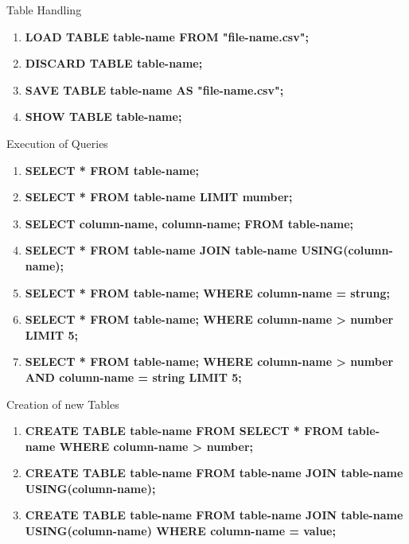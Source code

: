 \documentclass{article}
\begin{document}
\textbf{}
\vspace{0.5cm}

\setlength{\parindent}{10ex}
Table Handling \par
\vspace{0.5cm}
\begin{enumerate}
\item \textbf{LOAD TABLE table-name FROM "file-name.csv"; }
\item  \textbf{DISCARD TABLE table-name; }
\item \textbf{SAVE TABLE table-name AS "file-name.csv";}
\item \textbf{SHOW TABLE table-name;}
\end{enumerate}

\vspace{0.5cm}
	\setlength{\parindent}{10ex}
	Execution of Queries \par
\vspace{0.5cm}
\begin{enumerate}
\item \textbf{SELECT * FROM  table-name;}
\item \textbf{SELECT * FROM  table-name LIMIT mumber; }
\item \textbf{SELECT  column-name, column-name; FROM  table-name; }
\item \textbf{SELECT * FROM table-name  JOIN  table-name USING(column-name);}
\item \textbf{SELECT * FROM  table-name; WHERE  column-name = strung;}
\item \textbf{SELECT * FROM  table-name; WHERE column-name > number LIMIT 5;}
\item \textbf{SELECT * FROM  table-name; WHERE column-name > number AND column-name = string LIMIT 5;}
\end{enumerate}

\vspace{0.5cm}
	\setlength{\parindent}{10ex}
		Creation of new Tables \par
  \vspace{0.5cm}
\begin{enumerate}
\item \textbf{CREATE TABLE table-name FROM SELECT * FROM table-name WHERE column-name > number; }
\item \textbf{CREATE TABLE table-name FROM table-name JOIN table-name USING(column-name);}
\item \textbf{CREATE TABLE table-name FROM table-name JOIN table-name  USING(column-name) WHERE column-name = value;}
\end{enumerate}
\end{document}
